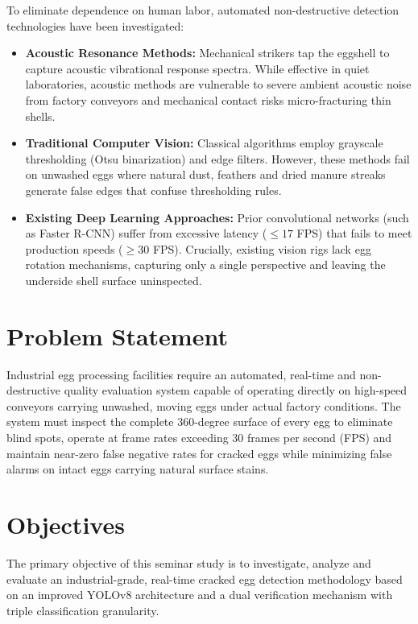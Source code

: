\documentclass[12pt,a4paper]{report}
\begin{document}
To eliminate dependence on human labor, automated non-destructive detection technologies have been investigated:
\begin{itemize}

    \item \textbf{Acoustic Resonance Methods:} Mechanical strikers tap the eggshell to capture acoustic vibrational response spectra. While effective in quiet laboratories, acoustic methods are vulnerable to severe ambient acoustic noise from factory conveyors and mechanical contact risks micro-fracturing thin shells.

    \item \textbf{Traditional Computer Vision:} Classical algorithms employ grayscale thresholding (Otsu binarization) and edge filters. However, these methods fail on unwashed eggs where natural dust, feathers and dried manure streaks generate false edges that confuse thresholding rules.

    \item \textbf{Existing Deep Learning Approaches:} Prior convolutional networks (such as Faster R-CNN) suffer from excessive latency ($\le 17$ FPS) that fails to meet production speeds ($\ge 30$ FPS). Crucially, existing vision rigs lack egg rotation mechanisms, capturing only a single perspective and leaving the underside shell surface uninspected.

\end{itemize}

\section{Problem Statement}

Industrial egg processing facilities require an automated, real-time and non-destructive quality evaluation system capable of operating directly on high-speed conveyors carrying unwashed, moving eggs under actual factory conditions. The system must inspect the complete 360-degree surface of every egg to eliminate blind spots, operate at frame rates exceeding 30 frames per second (FPS) and maintain near-zero false negative rates for cracked eggs while minimizing false alarms on intact eggs carrying natural surface stains.

\section{Objectives}

The primary objective of this seminar study is to investigate, analyze and evaluate an industrial-grade, real-time cracked egg detection methodology based on an improved YOLOv8 architecture and a dual verification mechanism with triple classification granularity.
\end{document}
